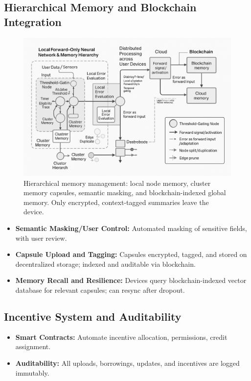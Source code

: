 \documentclass[11pt]{article}
\begin{document}
\subsection{Hierarchical Memory and Blockchain Integration}

\begin{figure}[ht]
    \centering
    \includegraphics[width=0.63\linewidth]{architecture_diagrams/bbe6c593-355f-42f7-a0a1-79f3937b8efa.png}
    \caption{
        Hierarchical memory management: local node memory, cluster memory capsules, semantic masking, and blockchain-indexed global memory. Only encrypted, context-tagged summaries leave the device.
    }
    \label{fig:overview-mem-management}
\end{figure}

\begin{itemize}
    \item \textbf{Semantic Masking/User Control:} Automated masking of sensitive fields, with user review.
    \item \textbf{Capsule Upload and Tagging:} Capsules encrypted, tagged, and stored on decentralized storage; indexed and auditable via blockchain.
    \item \textbf{Memory Recall and Resilience:} Devices query blockchain-indexed vector database for relevant capsules; can resync after dropout.
\end{itemize}

\subsection{Incentive System and Auditability}

\begin{itemize}
    \item \textbf{Smart Contracts:} Automate incentive allocation, permissions, credit assignment.
    \item \textbf{Auditability:} All uploads, borrowings, updates, and incentives are logged immutably.
\end{itemize}
\end{document}
